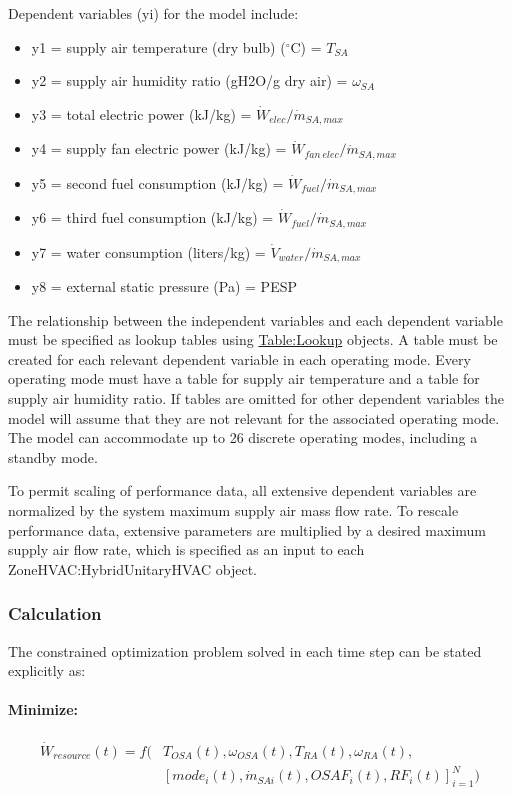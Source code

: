 Dependent variables (yi) for the model include:
\begin{itemize}
 \item y1 = supply air temperature (dry bulb) ($^{\circ}$C) = \({T_{SA}}\)
 \item y2 = supply air humidity ratio (gH2O/g dry air) = \({\omega_{SA}}\)
 \item y3 = total electric power (kJ/kg) = \({\dot W_{elec}}/{\dot m_{SA,max}}\)
 \item y4 = supply fan electric power (kJ/kg) = \({\dot W_{fan~elec}}/{\dot m_{SA,max}}\)
 \item y5 = second fuel consumption (kJ/kg) = \({\dot W_{fuel}}/{\dot m_{SA,max}}\)
 \item y6 = third fuel consumption (kJ/kg) = \({\dot W_{fuel}}/{\dot m_{SA,max}}\)
 \item y7 = water consumption (liters/kg) = \({\dot V_{water}}/{\dot m_{SA,max}}\)
 \item y8 = external static pressure (Pa) = PESP
\end{itemize}

The relationship between the independent variables and each dependent variable must be specified as lookup tables using \hyperref[table-lookup]{Table:Lookup} objects. A table must be created for each relevant dependent variable in each operating mode. Every operating mode must have a table for supply air temperature and a table for supply air humidity ratio. If tables are omitted for other dependent variables the model will assume that they are not relevant for the associated operating mode. The model can accommodate up to 26 discrete operating modes, including a standby mode.

To permit scaling of performance data, all extensive dependent variables are normalized by the system maximum supply air mass flow rate.  To rescale performance data, extensive parameters are multiplied by a desired maximum supply air flow rate, which is specified as an input to each ZoneHVAC:HybridUnitaryHVAC object.

\subsubsection{Calculation}

The constrained optimization problem solved in each time step can be stated explicitly as:

\paragraph{Minimize:}
\begin{align}
 \dot{W}_{resource}(t) = f( & T_{OSA}(t), \omega_{OSA}(t), T_{RA}(t), \omega_{RA}(t), \nonumber \\
                            & [ mode_{i}(t), \dot{m}_{SAi}(t), OSAF_{i}(t), RF_{i}(t) ]_{i=1}^{N} )
\end{align}

